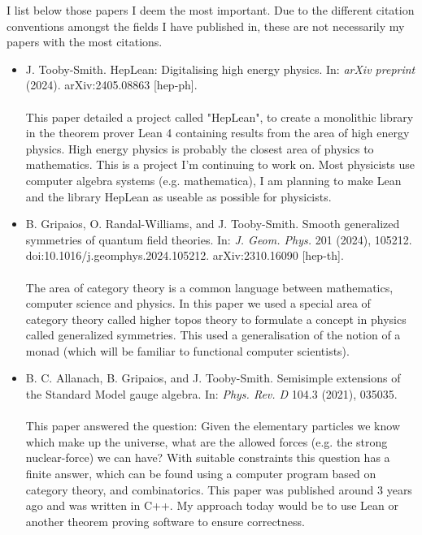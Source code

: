\documentclass[14pt,letter]{article}
\newcommand{\mybullet}{\textcolor{mycolor}{$\ast$}\ }
\newcounter{customtitle}
\begin{document}
\vspace{0.3cm}
I list below those papers I deem the most important. Due to the different citation conventions amongst the fields I have published in, these are not necessarily my papers with the most citations.
\begin{itemize}[label=\mybullet]
\item J. Tooby-Smith. {\color{mycolor} HepLean: Digitalising high energy physics}. In: \emph{arXiv preprint} (2024). arXiv:2405.08863 [hep-ph].
~\\ 
~\\ This paper detailed a project called "HepLean", to create a monolithic library in the theorem prover Lean 4 containing results from the area of high energy physics. High energy physics is probably the closest area of physics to mathematics. This is a project I'm continuing to work on. Most physicists use computer algebra systems (e.g. mathematica), I am planning to make Lean and the library HepLean as useable as possible for physicists. 
 
 \item  B. Gripaios, O. Randal-Williams, and J. Tooby-Smith. {\color{mycolor} Smooth generalized symmetries of quantum field theories}. In: \emph{J. Geom. Phys.} 201 (2024), 105212. doi:10.1016/j.geomphys.2024.105212. arXiv:2310.16090 [hep-th]. 
~\\
~\\The area of category theory is a common language between mathematics, computer science and physics. In this paper we used a special area of category theory called higher topos theory to formulate a concept in physics called generalized symmetries. This used a generalisation of the notion of a monad (which will be familiar to functional computer scientists).
\item B. C. Allanach, B. Gripaios, and J. Tooby-Smith. {\color{mycolor} Semisimple extensions of the Standard Model gauge algebra}. In: \emph{Phys. Rev. D} 104.3 (2021), 035035. 
~\\
~\\ This paper answered the question: Given the elementary particles we know which make up the universe, what are the allowed forces (e.g. the strong nuclear-force) we can have? With suitable constraints this question has a finite answer, which can be found using a computer program based on category theory, and combinatorics. This paper was published around 3 years ago and was written in C++. My approach today would be to use Lean or another theorem proving software to ensure correctness. 
 
\end{itemize}
\end{document}
